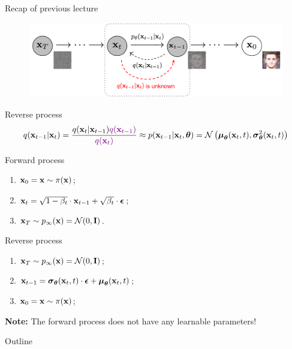 \begin{frame}{Recap of previous lecture}
	\begin{figure}
		\includegraphics[width=0.8\linewidth]{figs/DDPM}
	\end{figure}
	\vspace{-0.5cm}
	\begin{block}{Reverse process}
		\vspace{-0.5cm}
		{\small
		\[
			q(\mathbf{x}_{t-1}|\mathbf{x}_{t}) = \frac{q(\mathbf{x}_{t}|\mathbf{x}_{t-1}) {\color{violet}q(\mathbf{x}_{t-1})}}{{\color{violet}q(\mathbf{x}_{t})}} \approx p(\mathbf{x}_{t - 1} | \mathbf{x}_t, \boldsymbol{\theta}) = \mathcal{N} \left(\boldsymbol{\mu}_{\boldsymbol{\theta}}(\mathbf{x}_t, t), \boldsymbol{\sigma}_{\boldsymbol{\theta}}^2(\mathbf{x}_t, t)\right)
		\]
		}
		\vspace{-0.5cm}
	\end{block}
	\begin{minipage}{0.5\linewidth}
		\begin{block}{Forward process}
			\begin{enumerate}
				\item $\mathbf{x}_0 = \mathbf{x} \sim \pi(\mathbf{x})$;
				\item $\mathbf{x}_t = \sqrt{1 - \beta_t} \cdot \mathbf{x}_{t - 1} + \sqrt{\beta_t} \cdot \boldsymbol{\epsilon}$;
				\item $\mathbf{x}_T \sim p_{\infty}(\mathbf{x}) = \mathcal{N}(0, \mathbf{I})$.
			\end{enumerate}
		\end{block}
	\end{minipage}%
	\begin{minipage}{0.55\linewidth}
		\begin{block}{Reverse process}
			\begin{enumerate}
				\item $\mathbf{x}_T \sim p_{\infty}(\mathbf{x}) = \mathcal{N}(0, \mathbf{I})$;
				\item $\mathbf{x}_{t - 1} = \boldsymbol{\sigma}_{\boldsymbol{\theta}}(\mathbf{x}_t, t) \cdot \boldsymbol{\epsilon} + \boldsymbol{\mu}_{\boldsymbol{\theta}}(\mathbf{x}_t, t)$;
				\item $\mathbf{x}_0 = \mathbf{x} \sim \pi(\mathbf{x})$;
			\end{enumerate}
		\end{block}
	\end{minipage}
	\textbf{Note:} The forward process does not have any learnable parameters!
\end{frame}
\begin{frame}{Outline}
	\tableofcontents
\end{frame}
